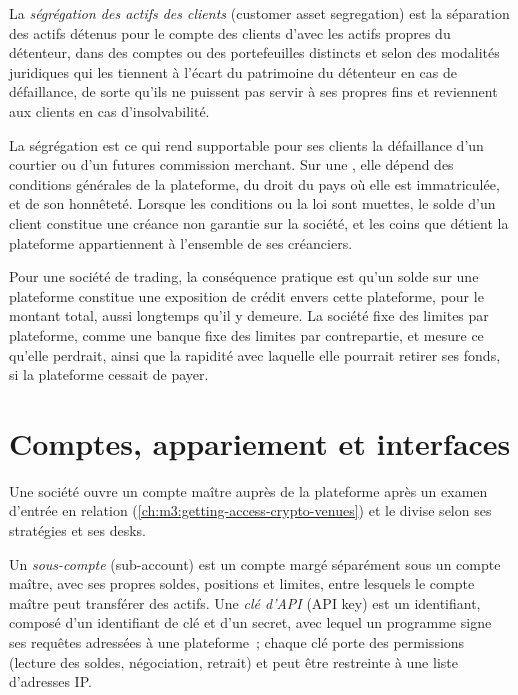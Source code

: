\begin{definition}\label{def:m3:centralised-exchanges:segregation}
La \emph{ségrégation des actifs des clients} (customer asset segregation) est la séparation des actifs détenus
pour le compte des clients d'avec les actifs propres du détenteur, dans des comptes ou des portefeuilles distincts et selon des modalités juridiques qui
les tiennent à l'écart du patrimoine du détenteur en cas de défaillance, de sorte qu'ils ne puissent pas servir à ses propres fins et
reviennent aux clients en cas d'insolvabilité.
\end{definition}

La ségrégation est ce qui rend supportable pour ses clients la défaillance d'un courtier ou d'un futures
commission merchant. Sur une , elle dépend des conditions générales de la plateforme, du droit du pays où elle est
immatriculée, et de son honnêteté. Lorsque les conditions ou la loi sont muettes, le solde d'un client constitue une créance
non garantie sur la société, et les coins que détient la plateforme appartiennent à l'ensemble
de ses créanciers.

Pour une société de trading, la conséquence pratique est qu'un solde sur une plateforme constitue une exposition de crédit
envers cette plateforme, pour le montant total, aussi longtemps qu'il y demeure. La société fixe des limites par plateforme, comme une
banque fixe des limites par contrepartie, et mesure ce qu'elle perdrait, ainsi que la rapidité avec
laquelle elle pourrait retirer ses fonds, si la plateforme cessait de payer.

\section{Comptes, appariement et interfaces}

Une société ouvre un compte maître auprès de la plateforme après un examen d'entrée en relation (\cref{ch:m3:getting-access-crypto-venues})
et le divise selon ses stratégies et ses desks.

\begin{definition}\label{def:m3:centralised-exchanges:subaccount}
Un \emph{sous-compte} (sub-account) est un compte margé séparément sous un compte maître, avec
ses propres soldes, positions et limites, entre lesquels le compte maître peut transférer des actifs. Une
\emph{clé d'API} (API key) est un identifiant, composé d'un identifiant de clé et d'un secret, avec lequel un programme signe ses
requêtes adressées à une plateforme~; chaque clé porte des permissions (lecture des soldes, négociation, retrait) et peut être
restreinte à une liste d'adresses IP.
\end{definition}

